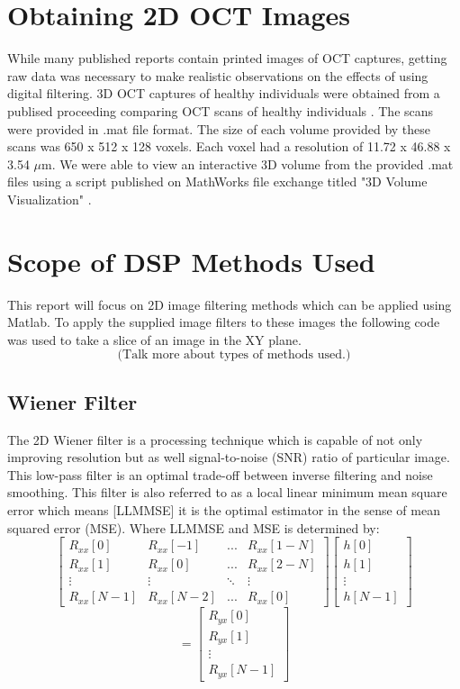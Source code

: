 \documentclass[%
reprint,
showpacs,preprintnumbers,
bibnotes,
amsmath,amssymb,
aps,
pra,
]{revtex4-1}
\begin{document}
	\section{\label{sec:level1} Obtaining 2D OCT Images}
	While many published reports contain printed images of OCT captures, getting raw data was necessary to make realistic observations on the effects of using digital filtering. 3D OCT captures of healthy individuals were obtained from a publised proceeding comparing OCT scans of healthy individuals \cite{tahereh_2014}. The scans were provided in .mat file format. The size of each volume provided by these scans was 650 x 512 x 128 voxels. Each voxel had a resolution of 11.72 x 46.88 x 3.54 $\mu$m. We were able to view an interactive 3D volume from the provided .mat files using a script published on MathWorks file exchange titled "3D Volume Visualization" \cite{stough}.


	\section{\label{sec:level1} Scope of DSP Methods Used}
	This report will focus on 2D image filtering methods which can be applied using Matlab. To apply the supplied image filters to these images the following code was used to take a slice of an image in the XY plane.
	$$\text{(Talk more about types of methods used.)}$$
	\subsection{\label{sec:level2} Wiener Filter}
	The 2D Wiener filter is a processing technique which is capable of not only improving resolution but as well signal-to-noise (SNR) ratio of particular image. This low-pass filter is an optimal trade-off between inverse filtering and noise smoothing. This filter is also referred to as a local linear minimum mean square error which means [LLMMSE] it is the optimal estimator in the sense of mean squared error (MSE). Where LLMMSE and MSE is determined by:
$$
\begin{bmatrix}
R_{xx}[0] & R_{xx}[-1] & ... & R_{xx}[1-N]\\
R_{xx}[1] & R_{xx}[0] & ... & R_{xx}[2-N]\\
\vdots & \vdots & \ddots & \vdots \\
R_{xx}[N-1] & R_{xx}[N-2] & ... & R_{xx}[0]
\end{bmatrix}
\begin{bmatrix}
h[0]\\
h[1]\\
\vdots\\
h[N-1]
\end{bmatrix}
$$
$$
=
\begin{bmatrix}
R_{yx}[0]\\
R_{yx}[1]\\
\vdots\\
R_{yx}[N-1]
\end{bmatrix}
$$
\end{document}
